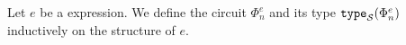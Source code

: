 %
%
%
%

Let $e$ be a \langfor expression. We define the circuit $\Phi_n^e$ and its type $\texttt{type}_{\mathcal{S}}(\Phi_n^e)$ inductively on the structure of $e$.

